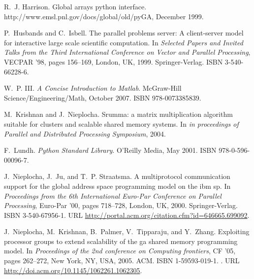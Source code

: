 \documentclass{sigplanconf}
\begin{document}
\begin{thebibliography}{35}
R.~J. Harrison.
\newblock Global arrays python interface.
\newblock http://www.emsl.pnl.gov/docs/global/old/pyGA, December 1999.

P.~Husbands and C.~Isbell.
\newblock The parallel problems server: A client-server model for interactive
  large scale scientific computation.
\newblock In \emph{Selected Papers and Invited Talks from the Third
  International Conference on Vector and Parallel Processing}, VECPAR '98,
  pages 156--169, London, UK, 1999. Springer-Verlag.
\newblock ISBN 3-540-66228-6.

W.~P. III.
\newblock \emph{A Concise Introduction to Matlab}.
\newblock McGraw-Hill Science/Engineering/Math, October 2007.
\newblock ISBN 978-0073385839.

M.~Krishnan and J.~Nieplocha.
\newblock Srumma: a matrix multiplication algorithm suitable for clusters and
  scalable shared memory systems.
\newblock In \emph{in proceedings of Parallel and Distributed Processing
  Symposium}, 2004.

F.~Lundh.
\newblock \emph{Python Standard Library}.
\newblock O'Reilly Media, May 2001.
\newblock ISBN 978-0-596-00096-7.

J.~Nieplocha, J.~Ju, and T.~P. Straatsma.
\newblock A multiprotocol communication support for the global address space
  programming model on the ibm sp.
\newblock In \emph{Proceedings from the 6th International Euro-Par Conference
  on Parallel Processing}, Euro-Par '00, pages 718--728, London, UK, 2000.
  Springer-Verlag.
\newblock ISBN 3-540-67956-1.
\newblock URL \url{http://portal.acm.org/citation.cfm?id=646665.699092}.

\vfill\eject

J.~Nieplocha, M.~Krishnan, B.~Palmer, V.~Tipparaju, and Y.~Zhang.
\newblock Exploiting processor groups to extend scalability of the ga shared
  memory programming model.
\newblock In \emph{Proceedings of the 2nd conference on Computing frontiers},
  CF '05, pages 262--272, New York, NY, USA, 2005{}. ACM.
\newblock ISBN 1-59593-019-1.
\newblock {}.
\newblock URL \url{http://doi.acm.org/10.1145/1062261.1062305}.


\end{thebibliography}
\end{document}
